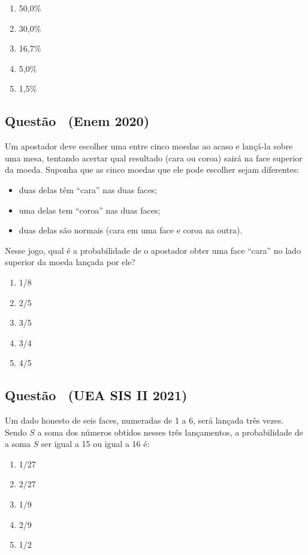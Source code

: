 \documentclass[12pt]{article}
\newcounter{questao}
\newcommand{\novaquestao}[1]{%
  \stepcounter{questao}%
  \subsection*{Questão \thequestao\ (#1)}%
}
\begin{document}
\begin{multicols}{2}
            \begin{enumerate}[label=(\alph*), noitemsep]
                \item 50,0\%
                \item 30,0\%
                \item 16,7\%
                \item 5,0\%
                \item 1,5\%
            \end{enumerate}
        
        \novaquestao{Enem 2020}

            Um apostador deve escolher uma entre cinco moedas ao acaso e lançá-la sobre uma 
            mesa, tentando acertar qual resultado (cara ou coroa) sairá na face superior da 
            moeda. Suponha que as cinco moedas que ele pode escolher sejam diferentes:

            \begin{itemize}
                \item duas delas têm “cara” nas duas faces;
                \item uma delas tem “coroa” nas duas faces;
                \item duas delas são normais (cara em uma face e coroa na outra).
            \end{itemize} Nesse jogo, qual é a probabilidade de o apostador obter uma face 
            “cara” no lado superior da moeda lançada por ele?

            \begin{enumerate}[label=(\alph*), noitemsep]
                \item {1}/{8}
                \item {2}/{5}
                \item {3}/{5}
                \item {3}/{4}
                \item {4}/{5}
            \end{enumerate}

        \novaquestao{UEA SIS II 2021}

            Um dado honesto de seis faces, numeradas de 1 a 6, será
            lançada três vezes. Sendo $S$ a soma dos números obtidos
            nesses três lançamentos, a probabilidade de a soma $S$ ser 
            igual a 15 ou igual a 16 é:

            \begin{enumerate}[label=(\alph*), noitemsep]
                \item {1}/{27}
                \item {2}/{27} %
                \item {1}/{9}
                \item {2}/{9}
                \item {1}/{2}
            \end{enumerate}


\end{multicols}
\end{document}
